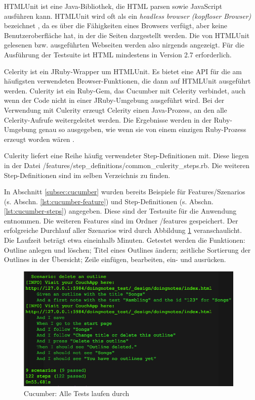 HTMLUnit ist eine Java-Bibliothek, die HTML parsen sowie JavaScript ausführen kann. HTMLUnit wird oft als ein \textit{headless browser (kopfloser Browser)} bezeichnet \cite{culerity:introduction}, da es über die Fähigkeiten eines Browsers verfügt, aber keine Benutzeroberfläche hat, in der die Seiten dargestellt werden. Die von HTMLUnit gelesenen bzw. ausgeführten Webseiten werden also nirgends angezeigt. Für die Ausführung der Testsuite ist HTML mindestens in Version 2.7 erforderlich. 

Celerity ist ein JRuby-Wrapper um HTMLUnit. Es bietet eine API für die am häufigsten verwendeten Browser-Funktionen, die dann auf HTMLUnit ausgeführt werden. Culerity ist ein Ruby-Gem, das Cucumber mit Celerity verbindet, auch wenn der Code nicht in einer JRuby-Umgebung ausgeführt wird. Bei der Verwendung mit Culerity erzeugt Celerity einen Java-Prozess, an den alle Celerity-Aufrufe weitergeleitet werden. Die Ergebnisse werden in der Ruby-Umgebung genau so ausgegeben, wie wenn sie von einem einzigen Ruby-Prozess erzeugt worden wären \cite{culerity:introduction}.

Culerity liefert eine Reihe häufig verwendeter Step-Definitionen mit. Diese liegen in der Datei {\selectfont /features/step\_definitions/common\_culerity\_steps.rb}. Die weiteren Step-Definitionen sind im selben Verzeichnis zu finden. 

In Abschnitt \ref{subsec:cucumber} wurden bereits Beispiele für Features/Szenarios (s. Abschn. \ref{lst:cucumber-feature}) und Step-Definitionen (s. Abschn. \ref{lst:cucumber-steps}) angegeben. Diese sind der Testsuite für die Anwendung entnommen. Die weiteren Features sind im Ordner {\selectfont /features} gespeichert. Der erfolgreiche Durchlauf aller Szenarios wird durch Abbildung \ref{fig:cucumber-good} veranschaulicht. Die Laufzeit beträgt etwa eineinhalb Minuten. Getestet werden die Funktionen: Outline anlegen und löschen; Titel eines Outlines ändern; zeitliche Sortierung der Outlines in der Übersicht; Zeile einfügen, bearbeiten, ein- und ausrücken. 


\medskip
\begin{figure}[ht] 
  \begin{center}
    \includegraphics[width=\textwidth]{grafik/cucumber-example-good} 
  \end{center}
  \caption{Cucumber: Alle Tests laufen durch}
  \label{fig:cucumber-good} 
\end{figure}

